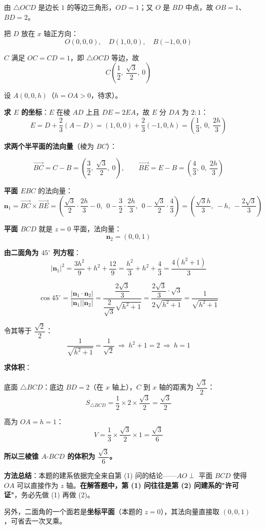 由 $\triangle OCD$ 是边长 $1$ 的等边三角形，$OD=1$；又 $O$ 是 $BD$ 中点，故 $OB=1$、$BD=2$。

把 $D$ 放在 $x$ 轴正方向：
\[O(0,0,0),\quad D(1,0,0),\quad B(-1,0,0)\]

$C$ 满足 $OC=CD=1$，即 $\triangle OCD$ 等边，故
\[C\left(\frac12,\ \frac{\sqrt3}2,\ 0\right)\]

设 $A(0,0,h)$（$h=OA>0$，待求）。

\textbf{求 $E$ 的坐标}：$E$ 在棱 $AD$ 上且 $DE=2EA$，故 $E$ 分 $DA$ 为 $2:1$：
\[E=D+\frac23\left(A-D\right)=(1,0,0)+\frac23(-1,0,h)=\left(\frac13,\ 0,\ \frac{2h}3\right)\]

\textbf{求两个半平面的法向量}（棱为 $BC$）：

\[\overrightarrow{BC}=C-B=\left(\frac32,\ \frac{\sqrt3}2,\ 0\right),\qquad \overrightarrow{BE}=E-B=\left(\frac43,\ 0,\ \frac{2h}3\right)\]

\textbf{平面 $EBC$} 的法向量：
\[\boldsymbol n_1=\overrightarrow{BC}\times\overrightarrow{BE}=\left(\frac{\sqrt3}2\cdot\frac{2h}3-0,\ \ 0-\frac32\cdot\frac{2h}3,\ \ 0-\frac{\sqrt3}2\cdot\frac43\right)=\left(\frac{\sqrt3h}3,\ -h,\ -\frac{2\sqrt3}3\right)\]

\textbf{平面 $BCD$} 就是 $z=0$ 平面，法向量：
\[\boldsymbol n_2=(0,0,1)\]

\textbf{由二面角为 $45^\circ$ 列方程}：
\[\left|\boldsymbol n_1\right|^{2}=\frac{3h^{2}}9+h^{2}+\frac{12}9=\frac{h^{2}}3+h^{2}+\frac43=\frac{4\left(h^{2}+1\right)}3\]

\[\cos45^\circ=\frac{\left|\boldsymbol n_1\cdot\boldsymbol n_2\right|}{\left|\boldsymbol n_1\right|\left|\boldsymbol n_2\right|}=\frac{\dfrac{2\sqrt3}3}{\dfrac2{\sqrt3}\sqrt{h^{2}+1}}=\frac{\dfrac{2\sqrt3}3\cdot\sqrt3}{2\sqrt{h^{2}+1}}=\frac{1}{\sqrt{h^{2}+1}}\]

令其等于 $\dfrac{\sqrt2}2$：
\[\frac1{\sqrt{h^{2}+1}}=\frac1{\sqrt2}\ \Longrightarrow\ h^{2}+1=2\ \Longrightarrow\ h=1\]

\textbf{求体积}：

底面 $\triangle BCD$：底边 $BD=2$（在 $x$ 轴上），$C$ 到 $x$ 轴的距离为 $\dfrac{\sqrt3}2$：
\[S_{\triangle BCD}=\frac12\times2\times\frac{\sqrt3}2=\frac{\sqrt3}2\]

高为 $OA=h=1$：
\[V=\frac13\times\frac{\sqrt3}2\times1=\frac{\sqrt3}6\]

\textbf{所以三棱锥 $A\text{-}BCD$ 的体积为 $\dfrac{\sqrt3}6$。}

\begin{gktip}
\textbf{方法总结}：本题的建系依据完全来自第 (1) 问的结论——$AO\perp$ 平面 $BCD$ 使得 $OA$ 可以直接作为 $z$ 轴。\textbf{在解答题中，第 (1) 问往往是第 (2) 问建系的"许可证"}，务必先做 (1) 再做 (2)。

另外，二面角的一个面若是\textbf{坐标平面}（本题的 $z=0$），其法向量直接取 $(0,0,1)$，可省去一次叉乘。
\end{gktip}

